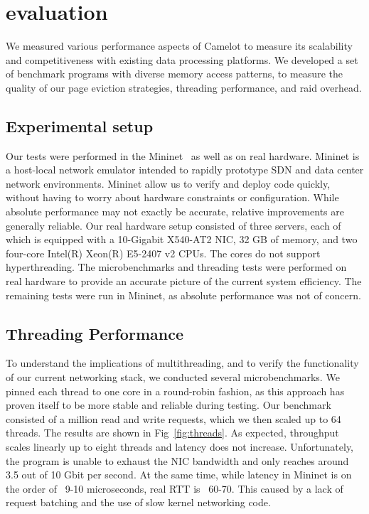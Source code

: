 \section{evaluation}
\label{sec:eval}
We measured various performance aspects of Camelot to measure its
scalability and competitiveness with existing data processing
platforms. We developed a set of benchmark programs with diverse
memory access patterns, to measure the quality of our page eviction
strategies, threading performance, and raid overhead.

\subsection{Experimental setup}
Our tests were performed in the Mininet~\cite{mininet} as well as on real hardware.
Mininet is a host-local network emulator intended to rapidly prototype SDN and data center network environments. Mininet allow us to verify and deploy code quickly, without having to worry about hardware constraints or configuration. While absolute performance may not exactly be accurate, relative improvements are generally reliable. 
Our real hardware setup consisted of three servers, each of which is equipped with a 10-Gigabit X540-AT2 NIC, 32 GB of memory, and two four-core Intel(R) Xeon(R) E5-2407 v2 CPUs. The cores do not support hyperthreading.
The microbenchmarks and threading tests were performed on real hardware to provide an accurate picture of the current system efficiency. The remaining tests were run in Mininet, as absolute performance was not of concern.

\subsection{Threading Performance}
To understand the implications of multithreading, and to verify the functionality of our current networking stack, we conducted several microbenchmarks. We pinned each thread to one core in a round-robin fashion, as this approach has proven itself to be more stable and reliable during testing. Our benchmark consisted of a million read and write requests, which we then scaled up to 64 threads. The results are shown in Fig~\ref{fig:threads}.
As expected, throughput scales linearly up to eight threads and latency does not increase. Unfortunately, the program is unable to exhaust the NIC bandwidth and only reaches around 3.5 out of 10 Gbit per second. At the same time, while latency in Mininet is on the order of ~9-10 microseconds, real RTT is ~60-70. This caused by a lack of request batching and the use of slow kernel networking code.

